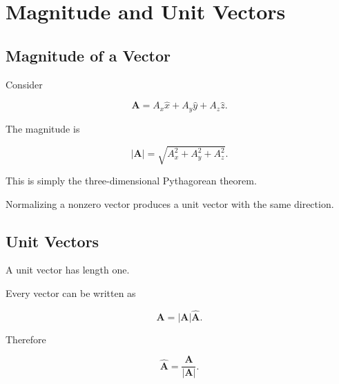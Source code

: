 \section{Magnitude and Unit Vectors}
\label{sec:magnitude-unit}

\subsection{Magnitude of a Vector}

Consider

\[
\mathbf A=
A_x\hat x
+
A_y\hat y
+
A_z\hat z.
\]

The magnitude is

\[
|\mathbf A|
=
\sqrt{
	A_x^2
	+
	A_y^2
	+
	A_z^2
}.
\]

This is simply the three-dimensional Pythagorean theorem.

\begin{bookfigure}{Normalizing a nonzero vector produces a unit vector with the same direction.}

\label{fig:unit-vector-geometry}
\end{bookfigure}


\subsection{Unit Vectors}

A unit vector has length one.

Every vector can be written as

\[
\mathbf A
=
|\mathbf A|
\hat{\mathbf A}.
\]

Therefore

\[
\hat{\mathbf A}
=
\frac{\mathbf A}{|\mathbf A|}.
\]

